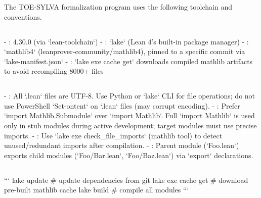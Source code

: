 \documentclass[11pt,a4paper]{article}
\theoremstyle{plain}
\theoremstyle{definition}
\begin{document}
\subsubsection{\1}

The TOE-SYLVA formalization program uses the following toolchain and conventions.

\subsection{\1}

- \textbf{\1}: 4.30.0 (via `lean-toolchain`)
- \textbf{\1}: `lake` (Lean 4's built-in package manager)
- \textbf{\1}: `mathlib4` (leanprover-community/mathlib4), pinned to a specific commit via `lake-manifest.json`
- \textbf{\1}: `lake exe cache get` downloads compiled mathlib artifacts to avoid recompiling 8000+ files

\subsection{\1}

- \textbf{\1}: All `.lean` files are UTF-8. Use Python or `lake` CLI for file operations; do not use PowerShell `Set-ontent` on `.lean` files (may corrupt encoding).
- \textbf{\1}: Prefer `import Mathlib.Submodule` over `import Mathlib`. Full `import Mathlib` is used only in stub modules during active development; target modules must use precise imports.
- \textbf{\1}: Use `lake exe check_file_imports` (mathlib tool) to detect unused/redundant imports after compilation.
- \textbf{\1}: Parent module (`Foo.lean`) exports child modules (`Foo/Bar.lean`, `Foo/Baz.lean`) via `export` declarations.

\subsection{\1}

```
lake update          # update dependencies from git
lake exe cache get  # download pre-built mathlib cache
lake build          # compile all modules
```

\subsection{\1}
\end{document}
